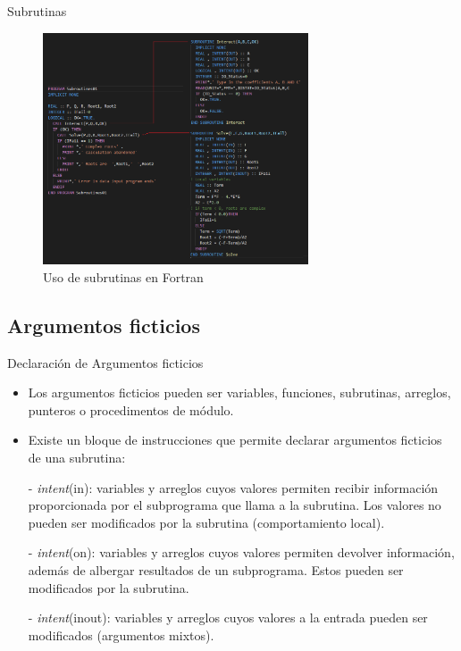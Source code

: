 \begin{frame}[fragile]{Subrutinas}
  \vspace{1cm}
  \begin{figure}
    \includegraphics[width=0.7\textwidth]{./resources/subroutines.png}
    \caption*{Uso de subrutinas en Fortran}
  \end{figure}
\end{frame}


\subsection{Argumentos ficticios}


\begin{frame}[fragile]{Declaración de Argumentos ficticios}
 \begin{itemize}[<+(0)->]
  \item Los argumentos ficticios pueden ser variables, funciones, subrutinas, arreglos, punteros o procedimentos de módulo.
  \item Existe un bloque de instrucciones que permite declarar argumentos ficticios de una subrutina:
  \item [-] \emph{intent}(in): variables y arreglos cuyos valores permiten recibir información proporcionada por el subprograma que llama a la subrutina. Los valores no pueden ser modificados por la subrutina (comportamiento local).
  \item [-] \emph{intent}(on): variables y arreglos cuyos valores permiten devolver información, además de albergar resultados de un subprograma. Estos pueden ser modificados por la subrutina.
  \item [-] \emph{intent}(inout): variables y arreglos cuyos valores a la entrada pueden ser modificados (argumentos mixtos).
 \end{itemize}
\end{frame}

